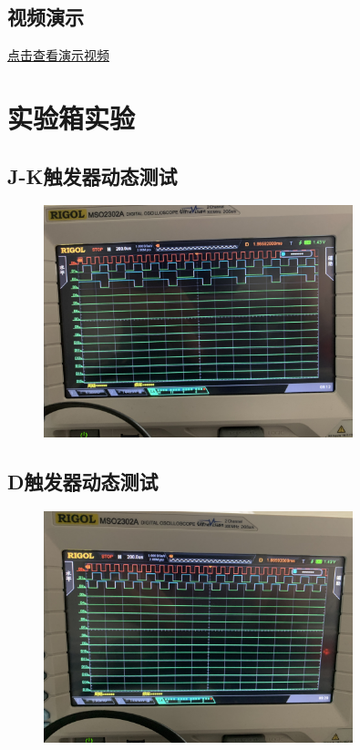 \documentclass[UTF8, a4paper, 11pt]{article}
\begin{document}
\subsection{视频演示}
\href{run:1.mp4}{点击查看演示视频} 
\section{实验箱实验}
\subsection{J-K触发器动态测试}
\begin{figure}[H]
    \centering
    \includegraphics[width=0.8\textwidth]{JK.png}
\end{figure}
\subsection{D触发器动态测试}
\begin{figure}[H]
    \centering
    \includegraphics[width=0.8\textwidth]{D.png}
\end{figure}
\end{document}

